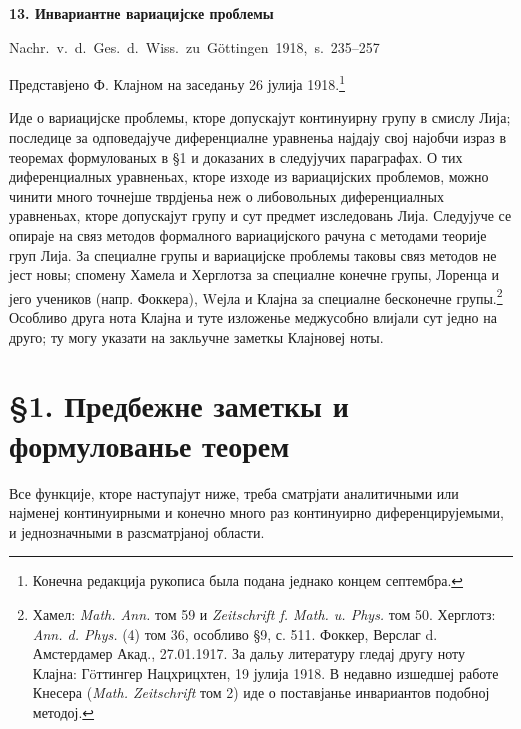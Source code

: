 ﻿\documentclass[11pt]{article}
\begin{document}

\begin{center}
{\Large\bfseries 13. Инвариантне вариацијске проблемы}\par
\vspace{1.5em}
\mbox{Nachr. v. d. Ges. d. Wiss. zu Göttingen 1918, s. 235--257}
\end{center}

\vspace{3em}
\begin{center}
Представјено Ф. Клајном на заседаньу 26 јулија 1918.\footnote{Конечна редакција рукописа была подана једнако концем септембра.}
\end{center}

Иде о вариацијске проблемы, кторе допускајут континуирну групу в смислу Лија; последице за одповедајуче диференциалне уравненьа најдају свој најобчи израз в теоремах формулованых в \S{}1 и доказаних в следујучих параграфах. О тих диференциалных уравненьах, кторе изходе из вариацијских проблемов, можно чинити много точнејше тврдјеньа неж о либовольных диференциалных уравненьах, кторе допускајут групу и сут предмет изследовань Лија. Следујуче се опираје на связ методов формалного вариацијского рачуна с методами теорије груп Лија. За специалне групы и вариацијске проблемы таковы связ методов не јест новы; спомену Хамела и Херглотза за специалне конечне групы, Лоренца и јего учеников (напр. Фоккера), Wејла и Клајна за специалне бесконечне групы.\footnote{Хамел: \emph{Math. Ann.} том 59 и \emph{Zeitschrift f. Math. u. Phys.} том 50. Херглотз: \emph{Ann. d. Phys.} (4) том 36, особливо \S{}9, с. 511. Фоккер, Верслаг d. Амстердамер Акад., 27.01.1917. За дальу литературу гледај другу ноту Клајна: Гöттингер Нацхрицхтен, 19 јулија 1918. В недавно изшедшеј работе Кнесера (\emph{Math. Zeitschrift} том 2) иде о поставјанье инвариантов подобној методој.} Особливо друга нота Клајна и туте изложенье меджусобно влијали сут једно на друго; ту могу указати на закльучне заметкы Клајновеј ноты.

\section*{\S{}1. Предбежне заметкы и формулованье теорем}

Все функције, кторе наступајут ниже, треба сматрјати аналитичными или најменеј континуирными и конечно много раз континуирно диференцирујемыми, и једнозначными в разсматрјаној области.
\end{document}
